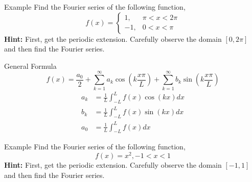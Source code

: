 \documentclass[11pt]{beamer}
\theoremstyle{plain}
\begin{document}
\begin{frame}{Example}
    Find the Fourier series of the following function,
    $$
    f(x)= \begin{cases}
        1, &\pi<x<2\pi\\
        -1, & 0<x<\pi
    \end{cases}
    $$
    \textbf{Hint:} First, get the periodic extension. Carefully observe the domain $[0,2\pi]$ and then find the Fourier series.
\end{frame}

\begin{frame}{General Formula}
$$
f(x)=\frac{a_0}{2}+\sum_{k=1}^\infty a_k \cos\left(k\frac{x\pi}{L}\right)+\sum_{k=1}^\infty b_k\sin\left(k\frac{x\pi}{L}\right)
$$
    \begin{align*}
        a_k &= \frac{1}{L} \int_{-L}^L f(x)\cos(kx) dx\\
        b_k &= \frac{1}{L} \int_{-L}^L f(x)\sin(kx) dx\\
        a_0 &= \frac{1}{L} \int_{-L}^L f(x) dx
    \end{align*}
\end{frame}

\begin{frame}{Example}
    Find the Fourier series of the following function,
    $$
    f(x)= x^2, -1<x<1
    $$
    \textbf{Hint:} First, get the periodic extension. Carefully observe the domain $[-1,1]$ and then find the Fourier series.
\end{frame}
\end{document}

